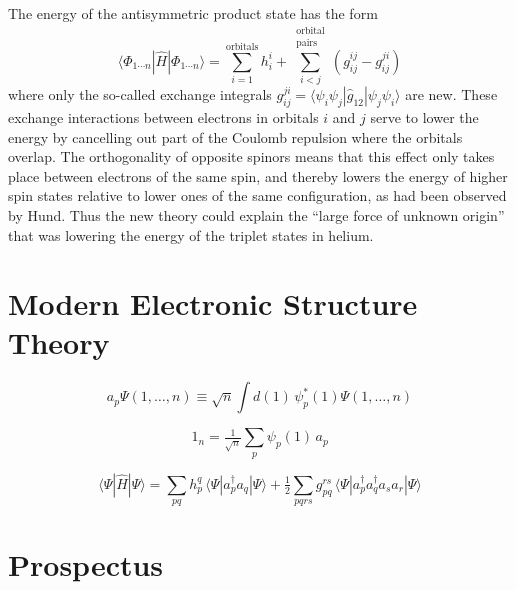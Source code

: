 The energy of the antisymmetric product state has the form
\begin{equation}
    \label{eq:introduction:determinant-expectation-value}
    \langle \Phi_{1\cdots n}|
    \hat{H}
    |\Phi_{1\cdots n} \rangle
    =
    \sum_{i=1}^\mathrm{orbitals}
    h_i^i
    +
    \sum_{i<j}^{\substack{\mathrm{orbital}\\\mathrm{pairs}}}
    (
        g_{ij}^{ij}
        -
        g_{ij}^{ji}
    )
\end{equation}
where only the so-called exchange integrals
\(
    g_{ij}^{ji}
    =
    \langle \psi_i\psi_j|\hat{g}_{12}|\psi_j\psi_i\rangle
\)
are new.
These exchange interactions between electrons in orbitals \(i\) and \(j\) serve
to lower the energy by cancelling out part of the Coulomb repulsion where the
orbitals overlap.
The orthogonality of opposite spinors means that this effect only takes place
between electrons of the same spin, and thereby lowers the energy of higher spin
states relative to lower ones of the same configuration, as had been observed by
Hund.\cite{Hund:1925p345}
Thus the new theory could explain the ``large force of unknown
origin''\cite{Mehra:1982} that was lowering the energy of the triplet states in
helium.


\section{Modern Electronic Structure Theory}

\begin{equation}
    a_p
    \Psi(1, \ldots, n)
    \equiv
    \sqrt{n}
    \int
    d(1)\,
    \psi_p^*(1)
    \Psi(1, \ldots, n)
\end{equation}

\begin{equation}
    1_n
    =
    \tfrac{1}{\sqrt{n}}
    \sum_p
    \psi_p(1)\,
    a_p
\end{equation}

\begin{equation}
    \langle\Psi|\hat{H}|\Psi\rangle
    =
    \sum_{pq}
    h_p^q\,
    \langle\Psi|a_p^\dagger a_q|\Psi\rangle
    +
    \tfrac{1}{2}
    \sum_{pqrs}
    g_{pq}^{rs}\,
    \langle\Psi|a_p^\dagger a_q^\dagger a_s a_r|\Psi\rangle
\end{equation}


\section{Prospectus}

